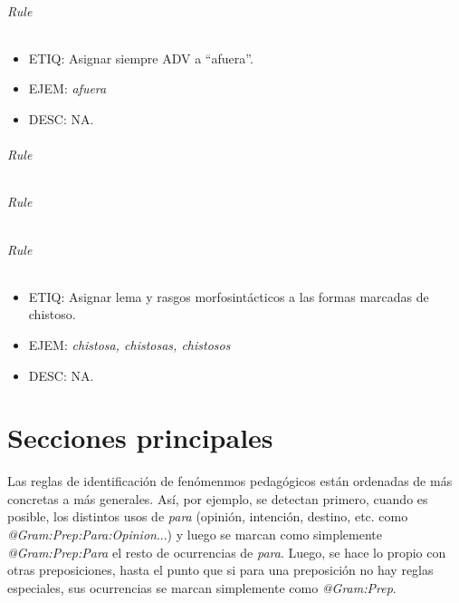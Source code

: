 \documentclass[11pt]{report}
\begin{document}
\paragraph*{Rule}
\begin{itemize}
\item ETIQ: Asignar siempre ADV a ``afuera''.
\item EJEM: \emph{afuera}
\item DESC: NA.
\end{itemize}

\paragraph*{Rule}
\paragraph*{Rule}
\paragraph*{Rule}
\begin{itemize}
\item ETIQ: Asignar lema y rasgos morfosintácticos a las formas marcadas de chistoso.
\item EJEM: \emph{chistosa, chistosas, chistosos}
\item DESC: NA.
\end{itemize}

\part{Secciones principales}
Las reglas de identificación de fenómenmos pedagógicos están ordenadas de más concretas a más generales. Así, por ejemplo, se detectan primero, cuando es posible, los distintos usos de \emph{para} (opinión, intención, destino, etc. como \emph{@Gram:Prep:Para:Opinion}...) y luego se marcan como simplemente \emph{@Gram:Prep:Para} el resto de ocurrencias de \emph{para}. Luego, se hace lo propio con otras preposiciones, hasta el punto que si para una preposición no hay reglas especiales, sus ocurrencias se marcan simplemente como \emph{@Gram:Prep}.
\end{document}

